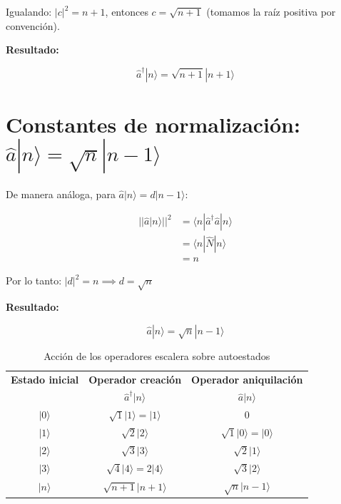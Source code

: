 \documentclass[11pt,a4paper,spanish]{book}
\begin{document}
Igualando: $|c|^2 = n + 1$, entonces $c = \sqrt{n+1}$ (tomamos la raíz positiva por convención).

\textbf{Resultado:}

\begin{equation}
	\boxed{\hat{a}^\dagger|n\rangle = \sqrt{n+1}|n+1\rangle}
\end{equation}

	

\section{Constantes de normalización: $\hat{a}|n\rangle = \sqrt{n}|n-1\rangle$} \label{sec:normalizacion2}

De manera análoga, para $\hat{a}|n\rangle = d|n-1\rangle$:

\begin{align}
	||\hat{a}|n\rangle||^2 &= \langle n|\hat{a}^\dagger\hat{a}|n\rangle \\
	&= \langle n|\hat{N}|n\rangle \\
	&= n
\end{align}

Por lo tanto: $|d|^2 = n \implies d = \sqrt{n}$

\textbf{Resultado:}

\begin{equation}
	\boxed{\hat{a}|n\rangle = \sqrt{n}|n-1\rangle}
\end{equation}

\begin{table}[h]
	\centering
	\caption{Acción de los operadores escalera sobre autoestados}
	\label{tab:operadores_escalera}
	\begin{tabular}{ccc}
		\hline
		\textbf{Estado inicial} & \textbf{Operador creación} & \textbf{Operador aniquilación} \\
		& $\hat{a}^\dagger|n\rangle$ & $\hat{a}|n\rangle$ \\
		\hline
		$|0\rangle$ & $\sqrt{1}|1\rangle = |1\rangle$ & $0$ \\
		$|1\rangle$ & $\sqrt{2}|2\rangle$ & $\sqrt{1}|0\rangle = |0\rangle$ \\
		$|2\rangle$ & $\sqrt{3}|3\rangle$ & $\sqrt{2}|1\rangle$ \\
		$|3\rangle$ & $\sqrt{4}|4\rangle = 2|4\rangle$ & $\sqrt{3}|2\rangle$ \\
		$|n\rangle$ & $\sqrt{n+1}|n+1\rangle$ & $\sqrt{n}|n-1\rangle$ \\
		\hline
	\end{tabular}
\end{table}
\end{document}
